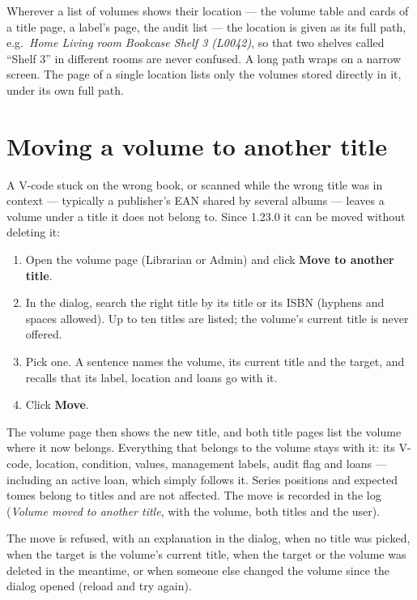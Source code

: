 Wherever a list of volumes shows their location --- the volume table
and cards of a title page, a label's page, the audit list --- the
location is given as its full path, e.g.\ \emph{Home
\textrightarrow{} Living room \textrightarrow{} Bookcase
\textrightarrow{} Shelf 3 (L0042)}, so that two shelves called
``Shelf 3'' in different rooms are never confused. A long path wraps
on a narrow screen. The page of a single location lists only the
volumes stored directly in it, under its own full path.

\section{Moving a volume to another title}\label{sec:move-volume-title}

A V-code stuck on the wrong book, or scanned while the wrong title was
in context --- typically a publisher's EAN shared by several albums
--- leaves a volume under a title it does not belong to. Since 1.23.0
it can be moved without deleting it:

\begin{enumerate}
  \item Open the volume page (Librarian or Admin) and click
        \textbf{Move to another title}.
  \item In the dialog, search the right title by its title or its ISBN
        (hyphens and spaces allowed). Up to ten titles are listed; the
        volume's current title is never offered.
  \item Pick one. A sentence names the volume, its current title and
        the target, and recalls that its label, location and loans go
        with it.
  \item Click \textbf{Move}.
\end{enumerate}

The volume page then shows the new title, and both title pages list
the volume where it now belongs. Everything that belongs to the
volume stays with it: its V-code, location, condition, values,
management labels, audit flag and loans --- including an active loan,
which simply follows it. Series positions and expected tomes belong to
titles and are not affected. The move is recorded in the log
(\emph{Volume moved to another title}, with the volume, both titles
and the user).

The move is refused, with an explanation in the dialog, when no title
was picked, when the target is the volume's current title, when the
target or the volume was deleted in the meantime, or when someone else
changed the volume since the dialog opened (reload and try again).

